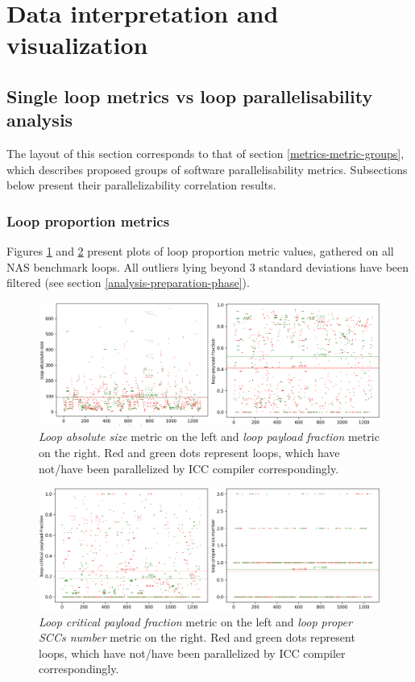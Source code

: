 \section{Data interpretation and visualization}
\label{analysis-data-interpretation-and-visualization}
\subsection{Single loop metrics vs loop parallelisability analysis}
\qquad The layout of this section corresponds to that of section \ref{metrics-metric-groups}, which describes proposed groups of software parallelisability metrics. Subsections below present their parallelizability correlation results.  
\subsubsection{Loop proportion metrics}
\label{analysis-loop-proportion-metrics}
\qquad Figures \ref{loop-proportions-0} and \ref{loop-proportions-1} present plots of loop proportion metric values, gathered on all NAS benchmark loops. All outliers lying beyond 3 standard deviations have been filtered (see section \ref{analysis-preparation-phase}). 
\begin{figure}[htb]
\centering
\includegraphics[width=\linewidth]{figs/loop-proportions-0.png}
\caption{\textit{Loop absolute size} metric on the left and \textit{loop payload fraction} metric on the right. Red and green dots represent loops, which have not/have been parallelized by ICC compiler correspondingly.}
\label{loop-proportions-0}
\end{figure}
\begin{figure}[htb]
\centering
\includegraphics[width=\linewidth]{figs/loop-proportions-1.png}
\caption{\textit{Loop critical payload fraction} metric on the left and \textit{loop proper SCCs number} metric on the right. Red and green dots represent loops, which have not/have been parallelized by ICC compiler correspondingly.}
\label{loop-proportions-1}
\end{figure} \newline
